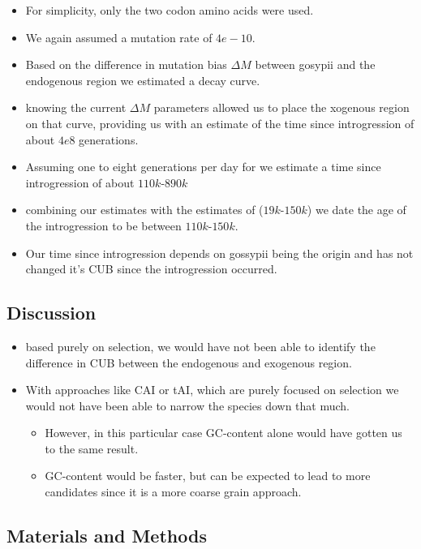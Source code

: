 \documentclass[12pt]{article}
\begin{document}
\begin{itemize}
	\begin{itemize}
		\item For simplicity, only the two codon amino acids were used. 
		\item We again assumed a mutation rate of $4e-10$.
		\item Based on the difference in mutation bias $\Delta M$ between gosypii and the endogenous region we estimated a decay curve.
		\item knowing the current $\Delta M$ parameters allowed us to place the xogenous region on that curve, providing us with an estimate of the time since introgression of about $4e8$ generations.
		\item Assuming one to eight generations per day for \kluyveri we estimate a time since introgression of about $110k$-$890k$
		\item combining our estimates with the estimates of \citep{friedrich2015} ($19k$-$150k$) we date the age of the introgression to be between $110k$-$150k$.
		\item Our time since introgression depends on gossypii being the origin and has not changed it's CUB since the introgression occurred.
	\end{itemize}
\end{itemize}


\subsection*{Discussion}

\begin{itemize}
	\item based purely on selection, we would have not been able to identify the difference in CUB between the endogenous and exogenous region.
	\item With approaches like CAI or tAI, which are purely focused on selection we would not have been able to narrow the species down that much.
	\begin{itemize}
		\item However, in this particular case GC-content alone would have gotten us to the same result. 
		\item GC-content would be faster, but can be expected to lead to more candidates since it is a more coarse grain approach. 
	\end{itemize}
\end{itemize}


\subsection*{Materials and Methods}
\end{document}
